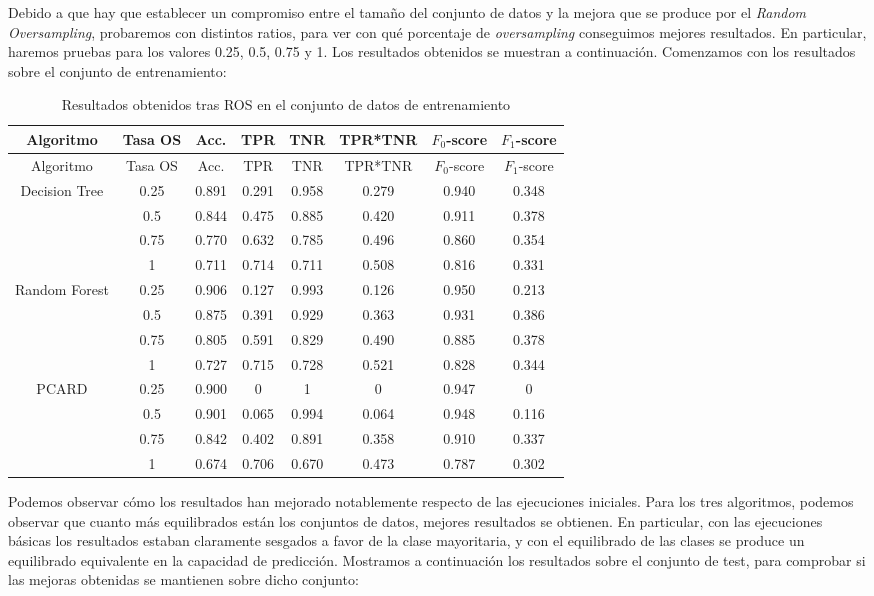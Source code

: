 \documentclass[
  a4paper,
,tablecaptionabove
]{scrartcl}
\begin{document}
Debido a que hay que establecer un compromiso entre el tamaño del
conjunto de datos y la mejora que se produce por el \emph{Random
Oversampling}, probaremos con distintos ratios, para ver con qué
porcentaje de \emph{oversampling} conseguimos mejores resultados. En
particular, haremos pruebas para los valores 0.25, 0.5, 0.75 y 1. Los
resultados obtenidos se muestran a continuación. Comenzamos con los
resultados sobre el conjunto de entrenamiento:

\begin{longtable}[]{@{}cccccccc@{}}
\caption{Resultados obtenidos tras ROS en el conjunto de datos de
entrenamiento}\tabularnewline
\toprule
Algoritmo & Tasa OS & Acc. & TPR & TNR & TPR*TNR & \(F_0\)-score &
\(F_1\)-score\tabularnewline
\midrule
\endfirsthead
\toprule
Algoritmo & Tasa OS & Acc. & TPR & TNR & TPR*TNR & \(F_0\)-score &
\(F_1\)-score\tabularnewline
\midrule
\endhead
Decision Tree & 0.25 & 0.891 & 0.291 & 0.958 & 0.279 & 0.940 &
0.348\tabularnewline
& 0.5 & 0.844 & 0.475 & 0.885 & 0.420 & 0.911 & 0.378\tabularnewline
& 0.75 & 0.770 & 0.632 & 0.785 & 0.496 & 0.860 & 0.354\tabularnewline
& 1 & 0.711 & 0.714 & 0.711 & 0.508 & 0.816 & 0.331\tabularnewline
\midrule
Random Forest & 0.25 & 0.906 & 0.127 & 0.993 & 0.126 & 0.950 &
0.213\tabularnewline
& 0.5 & 0.875 & 0.391 & 0.929 & 0.363 & 0.931 & 0.386\tabularnewline
& 0.75 & 0.805 & 0.591 & 0.829 & 0.490 & 0.885 & 0.378\tabularnewline
& 1 & 0.727 & 0.715 & 0.728 & 0.521 & 0.828 & 0.344\tabularnewline
\midrule
PCARD & 0.25 & 0.900 & 0 & 1 & 0 & 0.947 & 0\tabularnewline
& 0.5 & 0.901 & 0.065 & 0.994 & 0.064 & 0.948 & 0.116\tabularnewline
& 0.75 & 0.842 & 0.402 & 0.891 & 0.358 & 0.910 & 0.337\tabularnewline
& 1 & 0.674 & 0.706 & 0.670 & 0.473 & 0.787 & 0.302\tabularnewline
\bottomrule
\end{longtable}

Podemos observar cómo los resultados han mejorado notablemente respecto
de las ejecuciones iniciales. Para los tres algoritmos, podemos observar
que cuanto más equilibrados están los conjuntos de datos, mejores
resultados se obtienen. En particular, con las ejecuciones básicas los
resultados estaban claramente sesgados a favor de la clase mayoritaria,
y con el equilibrado de las clases se produce un equilibrado equivalente
en la capacidad de predicción. Mostramos a continuación los resultados
sobre el conjunto de test, para comprobar si las mejoras obtenidas se
mantienen sobre dicho conjunto:
\end{document}
